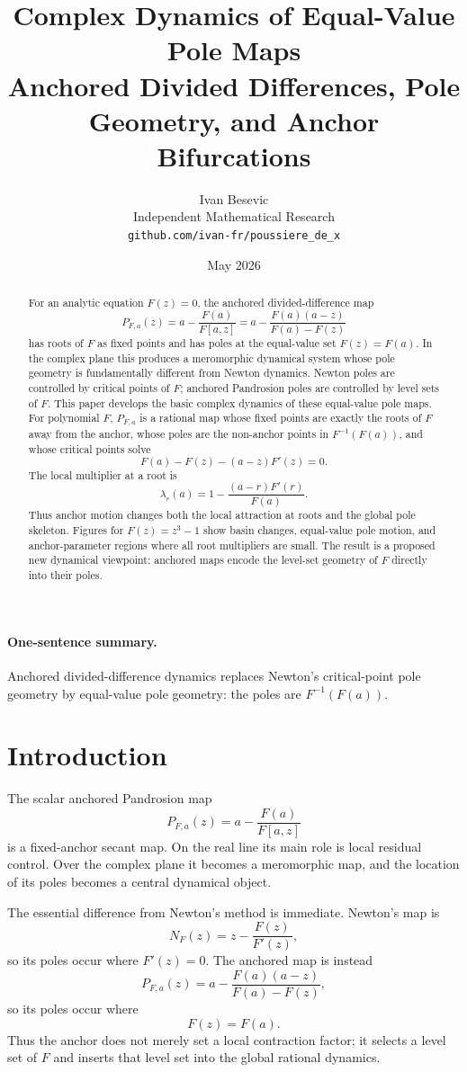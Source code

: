 \documentclass[11pt]{article}
\title{Complex Dynamics of Equal-Value Pole Maps\\
\large Anchored Divided Differences, Pole Geometry, and Anchor Bifurcations}
\author{Ivan Besevic\\Independent Mathematical Research\\\texttt{github.com/ivan-fr/poussiere\_de\_x}}
\date{May 2026}
\theoremstyle{definition}
\begin{document}
\maketitle

\begin{abstract}
For an analytic equation $F(z)=0$, the anchored divided-difference map
\[
P_{F,a}(z)=a-\frac{F(a)}{F[a,z]}
=a-\frac{F(a)(a-z)}{F(a)-F(z)}
\]
has roots of $F$ as fixed points and has poles at the equal-value set $F(z)=F(a)$. In the complex plane this produces a meromorphic dynamical system whose pole geometry is fundamentally different from Newton dynamics. Newton poles are controlled by critical points of $F$; anchored Pandrosion poles are controlled by level sets of $F$. This paper develops the basic complex dynamics of these equal-value pole maps. For polynomial $F$, $P_{F,a}$ is a rational map whose fixed points are exactly the roots of $F$ away from the anchor, whose poles are the non-anchor points in $F^{-1}(F(a))$, and whose critical points solve
\[
F(a)-F(z)-(a-z)F'(z)=0.
\]
The local multiplier at a root is
\[
\lambda_r(a)=1-\frac{(a-r)F'(r)}{F(a)}.
\]
Thus anchor motion changes both the local attraction at roots and the global pole skeleton. Figures for $F(z)=z^3-1$ show basin changes, equal-value pole motion, and anchor-parameter regions where all root multipliers are small. The result is a proposed new dynamical viewpoint: anchored maps encode the level-set geometry of $F$ directly into their poles.
\end{abstract}

\paragraph{One-sentence summary.}
Anchored divided-difference dynamics replaces Newton's critical-point pole geometry by equal-value pole geometry: the poles are $F^{-1}(F(a))$.

\section{Introduction}

The scalar anchored Pandrosion map
\[
P_{F,a}(z)=a-\frac{F(a)}{F[a,z]}
\]
is a fixed-anchor secant map. On the real line its main role is local residual control. Over the complex plane it becomes a meromorphic map, and the location of its poles becomes a central dynamical object.

The essential difference from Newton's method is immediate. Newton's map is
\[
N_F(z)=z-\frac{F(z)}{F'(z)},
\]
so its poles occur where $F'(z)=0$. The anchored map is instead
\[
P_{F,a}(z)=a-\frac{F(a)(a-z)}{F(a)-F(z)},
\]
so its poles occur where
\[
F(z)=F(a).
\]
Thus the anchor does not merely set a local contraction factor; it selects a level set of $F$ and inserts that level set into the global rational dynamics.
\end{document}

